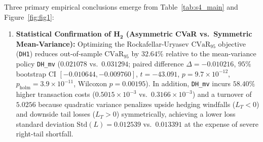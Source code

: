 \documentclass[11pt,a4paper]{article}
\begin{document}
Three primary empirical conclusions emerge from Table~\ref{tab:s4_main} and Figure~\ref{fig:fig1}:
\begin{enumerate}
  \item \textbf{Statistical Confirmation of $\mathbf{H_2}$ (Asymmetric CVaR vs.\ Symmetric Mean-Variance):} Optimizing the Rockafellar-Uryasev $\text{CVaR}_{95}$ objective (\texttt{DH1}) reduces out-of-sample $\text{CVaR}_{95}$ by $32.64\%$ relative to the mean-variance policy \texttt{DH\_mv} ($0.021078$ vs.\ $0.031294$; paired difference $\Delta = -0.010216$, $95\%$ bootstrap CI $[-0.010644, -0.009760]$, $t = -43.091$, $p = 9.7 \times 10^{-12}$, $p_{\text{holm}} = 3.9 \times 10^{-11}$, Wilcoxon $p = 0.00195$). In addition, \texttt{DH\_mv} incurs $58.40\%$ higher transaction costs ($0.5015 \times 10^{-3}$ vs.\ $0.3166 \times 10^{-3}$) and a turnover of $5.0256$ because quadratic variance penalizes upside hedging windfalls ($L_T < 0$) and downside tail losses ($L_T > 0$) symmetrically, achieving a lower loss standard deviation $\text{Std}(L) = 0.012539$ vs.\ $0.013391$ at the expense of severe right-tail shortfall.

\end{enumerate}
\end{document}
